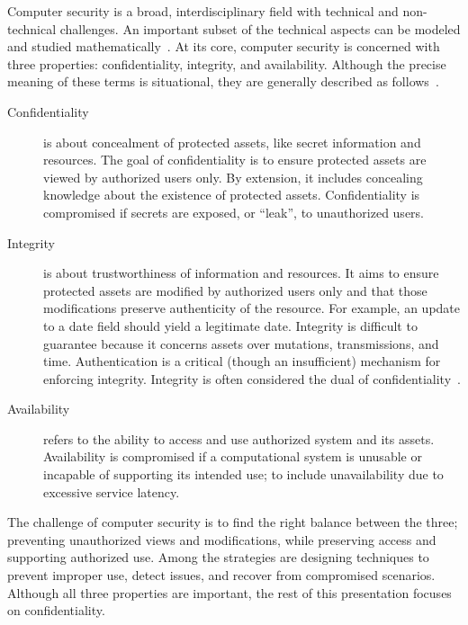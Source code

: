Computer security is a broad, interdisciplinary field with technical and non-technical challenges.
An important subset of the technical aspects can be modeled and studied mathematically~\cite{piessens2024}.
At its core, computer security is concerned with three properties:
confidentiality, integrity, and availability.
Although the precise meaning of these terms is situational, they are generally described as follows~\cite[p. 4--6]{bishop2003}.

\begin{description}
\item[Confidentiality]
is about concealment of protected assets, like secret information and resources.
The goal of confidentiality is to ensure protected assets are viewed by authorized users only.
By extension, it includes concealing knowledge about the existence of protected assets.
Confidentiality is compromised if secrets are exposed, or \enquote{leak}, to unauthorized users.

\item[Integrity]
is about trustworthiness of information and resources.
It aims to ensure protected assets are modified by authorized users only and that those modifications preserve authenticity of the resource.
For example, an update to a date field should yield a legitimate date.
Integrity is difficult to guarantee because it concerns assets over mutations, transmissions, and time.
Authentication is a critical (though an insufficient) mechanism for enforcing integrity.
Integrity is often considered the dual of {confidentiality}~\cite{biba1977}.

\item[Availability]
refers to the ability to access and use authorized system and its assets.
Availability is compromised if a computational system is unusable or incapable of supporting its intended use;
to include unavailability due to excessive service latency.

\end{description}
The challenge of computer security is to find the right balance between the three;
preventing unauthorized views and modifications, while preserving access and supporting authorized use.
Among the strategies are designing techniques to prevent improper use, detect issues, and recover from compromised scenarios.
Although all three properties are important, the rest of this presentation focuses on confidentiality.


